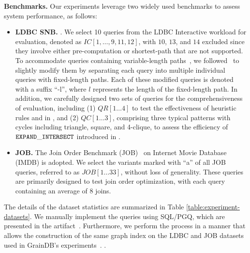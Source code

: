 \noindent\textbf{Benchmarks.} Our experiments leverage two widely used benchmarks to assess system performance, as follows:
\begin{itemize}
    \item \textbf{LDBC SNB.} .
    We select 10 queries from the LDBC Interactive workload for evaluation, denoted as $IC[1, \ldots, 9, 11, 12]$, with $10$, $13$, and $14$ excluded since they involve either pre-computation or shortest-path that are not supported.
    To accommodate queries containing variable-length paths~\cite{graindb}, we followed~\cite{graindb} to slightly modify them by separating each query into multiple individual queries with fixed-length paths. Each of these modified queries is denoted with a suffix ``-l'', where $l$ represents the length of the fixed-length path. In addition, we carefully designed two sets of queries for the comprehensiveness of evaluation, including (1) $QR[1\ldots 4]$ to test the effectiveness of heuristic rules \filterrule and \joinfuserule in \name, and (2) $QC[1\ldots 3]$, comprising three typical patterns with cycles including triangle, square, and 4-clique, to assess the efficiency of $\texttt{EXPAND}\_\texttt{INTERSECT}$ introduced in .
    \item \textbf{JOB.} The Join Order Benchmark (JOB)~\cite{job_snb} on Internet Movie Database (IMDB) is adopted. We select the variants marked with ``a'' of all JOB queries, referred to as $JOB[1\ldots 33]$, without loss of generality. These queries are primarily designed to test join order optimization, with each query containing an average of $8$ joins.
\end{itemize}
The details of the dataset statistics are summarized in Table \ref{table:experiment-datasets}.
We manually implement the queries using SQL/PGQ, which are presented in the artifact~\cite{artifact}.
Furthermore, we perform the \rgmapping process in a manner that allows the construction of the same graph index on the LDBC and JOB datasets used in GrainDB's experiments~\cite{graindb}.
.


